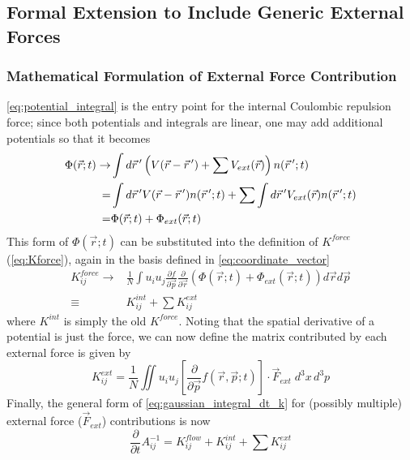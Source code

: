 
\subsection{Formal Extension to Include Generic External Forces} \label{sec:external_forces}

\subsubsection{Mathematical Formulation of External Force Contribution}
\ref{eq:potential_integral} is the entry point for the internal Coulombic repulsion force; since both potentials and integrals are linear, one may add additional potentials so that it becomes
\begin{equation}
  \begin{split}
    \Phi(\vec{r};t) \rightarrow & \int d\vec{r}\,^{\prime} \left( V(\vec{r} - \vec{r}\,^{\prime}) + \sum V_{ext}(\vec{r}) \right) n(\vec{r}\,^{\prime}; t) \\
    = & \int d\vec{r}\,^{\prime} V(\vec{r} - \vec{r}\,^{\prime}) n(\vec{r}\,^{\prime}; t) + \sum \int d\vec{r}\,^{\prime} V_{ext}(\vec{r}) n(\vec{r}\,^{\prime}; t) \\
    = & \Phi(\vec{r};t) + \Phi_{ext}(\vec{r};t)
  \end{split}
\end{equation}
This form of $\Phi(\vec{r};t)$ can be substituted into the definition of $K^{force}$ (\ref{eq:Kforce}), again in the basis defined in \ref{eq:coordinate_vector} 
\begin{equation}
  \begin{split}
    K^{force}_{ij} \rightarrow & \frac{1}{N} \int u_i u_j \frac{\partial f}{\partial \vec{p}} \frac{\partial}{\partial \vec{r}} \left( \Phi(\vec{r};t) + \Phi_{ext}(\vec{r};t) \right) d\vec{r} d\vec{p} \\
    \equiv & K^{int}_{ij} + \sum K^{ext}_{ij}
  \end{split}
\end{equation}
where $K^{int}$ is simply the old $K^{force}$. Noting that the spatial derivative of a potential is just the force, we can now define the matrix contributed by each external force is given by
\begin{equation} \label{eq:Kint}
  K^{ext}_{ij} = \frac{1}{N} \iint u_i u_j \left [ \frac{\partial}{\partial \vec{p}} f(\vec{r}, \vec{p}; t) \right ] \cdot \vec{F}_{ext}\;d^{3}x\,d^{3}p
\end{equation}
Finally, the general form of \ref{eq:gaussian_integral_dt_k} for (possibly multiple) external force ($\vec{F}_{ext}$) contributions is now
\begin{equation}
  \frac{\partial}{\partial t} A^{-1}_{ij} = K^{flow}_{ij} + K^{int}_{ij} + \sum K^{ext}_{ij}
\end{equation}


